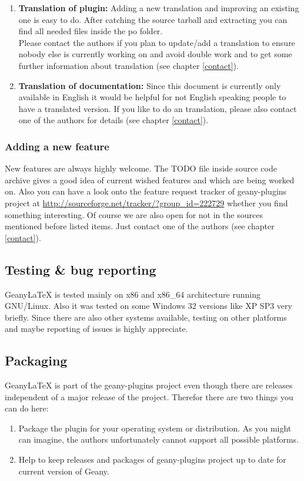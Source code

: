 \documentclass[%
a4paper,%
10pt,%
oneside,%
DIV18,
headsepline,
plainheadsepline,
footsepline,
plainfootsepline,
bibtotoc,%
liststotoc,%
BCOR12mm,%
halfparskip,%
openany,%
]{scrartcl}
\begin{document}
\begin{enumerate}
\item \textbf{Translation of plugin:}
	   Adding a new translation and improving an existing one is easy to
	   do. After catching the source tarball and extracting you can find
	   all needed files inside the po folder. \\
	   Please contact the authors if you plan to update/add a translation
	   to ensure nobody else is currently working on and avoid double
	   work and to get some further information about translation (see
	   chapter \ref{contact}).
\item \textbf{Translation of documentation:}
	   Since this document is currently only available in English it
	   would be helpful for not English speaking people to have a
	   translated version. If you like to do an translation, please
	   also contact one of the authors for details (see chapter \ref{contact}).
\end{enumerate}

\subsubsection{Adding a new feature}
New features are always highly welcome. The TODO file inside source
code archive gives a good idea of current wished features and which
are being worked on. Also you can have a look onto the feature request
tracker of geany-plugins project at
\url{http://sourceforge.net/tracker/?group\_id=222729} whether you find
something interesting. Of course we are also open for not in the
sources mentioned before listed items. Just contact one of the authors
(see chapter \ref{contact}).

\subsection{Testing \& bug reporting}
Geany\LaTeX{} is tested mainly on x86 and x86\_64 architecture running
GNU/Linux. Also it was tested on some Windows 32 versions like XP SP3
very briefly. Since there are also other systems available, testing on other
platforms and maybe reporting of issues is highly appreciate.

\subsection{Packaging}
Geany\LaTeX{} is part of the geany-plugins project even though there
are releases independent of a major release of the project. Therefor
there are two things you can do here:
\begin{enumerate}
	\item Package the plugin for your operating system or
	distribution. As you might can imagine, the authors unfortunately
	cannot support all possible platforms.
	\item Help to keep releases and packages of geany-plugins project
	up to date for current version of Geany.
\end{enumerate}
\end{document}

